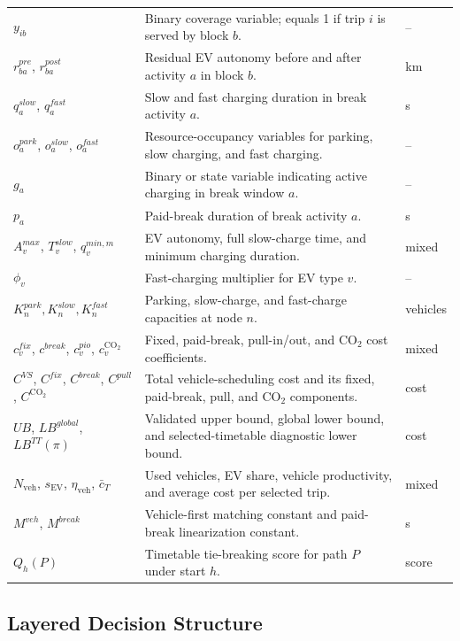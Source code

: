 \begin{table}[htbp]
\begin{tabularx}{\textwidth}{@{}>{\RaggedRight\arraybackslash}p{3.75cm}
>{\RaggedRight\arraybackslash}X
>{\RaggedRight\arraybackslash}p{1.05cm}@{}}
\(y_{ib}\) & Binary coverage variable; equals 1 if trip \(i\) is served by block \(b\). & -- \\
\(r_{ba}^{pre}\), \(r_{ba}^{post}\) & Residual EV autonomy before and after activity \(a\) in block \(b\). & km \\
\(q_a^{slow}\), \(q_a^{fast}\) & Slow and fast charging duration in break activity \(a\). & s \\
\(o_a^{park}\), \(o_a^{slow}\), \(o_a^{fast}\) & Resource-occupancy variables for parking, slow charging, and fast charging. & -- \\
\(g_a\) & Binary or state variable indicating active charging in break window \(a\). & -- \\
\(p_a\) & Paid-break duration of break activity \(a\). & s \\
\(A_v^{max}\), \(T_v^{slow}\), \(q_v^{min,m}\) & EV autonomy, full slow-charge time, and minimum charging duration. & mixed \\
\(\phi_v\) & Fast-charging multiplier for EV type \(v\). & -- \\
\(K_n^{park},K_n^{slow},K_n^{fast}\) & Parking, slow-charge, and fast-charge capacities at node \(n\). & vehicles \\
\(c_v^{fix}\), \(c^{break}\), \(c_v^{pio}\), \(c_v^{\mathrm{CO}_2}\) & Fixed, paid-break, pull-in/out, and CO\(_2\) cost coefficients. & mixed \\
\(C^{VS}\), \(C^{fix}\), \(C^{break}\), \(C^{pull}\), \(C^{\mathrm{CO}_2}\) & Total vehicle-scheduling cost and its fixed, paid-break, pull, and CO\(_2\) components. & cost \\
\(UB\), \(LB^{global}\), \(LB^{TT}(\pi)\) & Validated upper bound, global lower bound, and selected-timetable diagnostic lower bound. & cost \\
\(N_{\mathrm{veh}}\), \(s_{\mathrm{EV}}\), \(\eta_{\mathrm{veh}}\), \(\bar c_T\) & Used vehicles, EV share, vehicle productivity, and average cost per selected trip. & mixed \\
\(M^{veh}\), \(M^{break}\) & Vehicle-first matching constant and paid-break linearization constant. & s \\
\(Q_h(P)\) & Timetable tie-breaking score for path \(P\) under start \(h\). & score \\
\bottomrule
\end{tabularx}
\end{table}
\FloatBarrier

\subsection{Layered Decision Structure}

